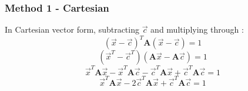 \documentclass{article}
\def\mat#1{\mathbf{#1}}
\begin{document}
\subsubsection{Method 1 - Cartesian}
In Cartesian vector form, subtracting $\vec{c}$ and multiplying through :
\begin{equation}
(\vec{x}-\vec{c})^T \mat{A} (\vec{x}-\vec{c}) = 1
\end{equation}
\begin{equation}
(\vec{x}^T-\vec{c}^T) (\mat{A}\vec{x}- \mat{A}\vec{c}) = 1
\end{equation}
\begin{equation}
\vec{x}^T \mat{A}\vec{x} - \vec{x}^T\mat{A}\vec{c}
- \vec{c}^T\mat{A}\vec{x} + \vec{c}^T\mat{A}\vec{c} = 1
\end{equation}
\begin{equation}
\vec{x}^T \mat{A}\vec{x} - 2\vec{c}^T\mat{A}\vec{x} + \vec{c}^T\mat{A}\vec{c} = 1
\end{equation}
%
\end{document}
